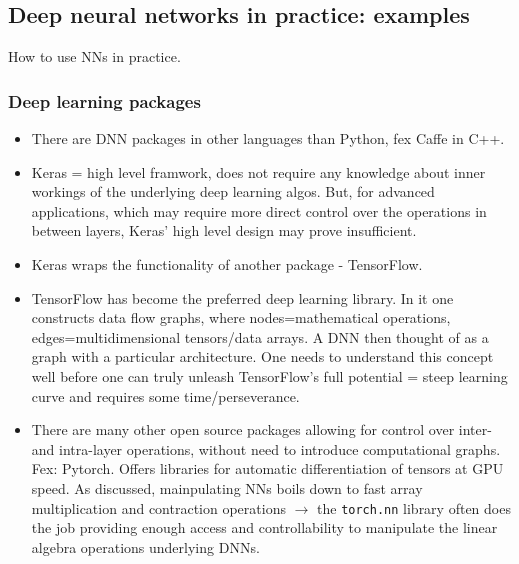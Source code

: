 \documentclass[norsk,a4paper,11pt]{article}
\begin{document}
\subsection{Deep neural networks in practice: examples}
How to use NNs in practice.

\subsubsection{Deep learning packages}
\begin{itemize}
	\item There are DNN packages in other languages than Python, fex Caffe in C++.
	\item Keras = high level framwork, does not require any knowledge about inner workings of the underlying deep learning algos. But, for advanced applications, which may require more direct control over the operations in between layers, Keras' high level design may prove insufficient.
	\item Keras wraps the functionality of another package - TensorFlow.
	\item TensorFlow has become the preferred deep learning library. In it one constructs data flow graphs, where nodes=mathematical operations, edges=multidimensional tensors/data arrays. A DNN then thought of as a graph with a particular architecture. One needs to understand this concept well before one can truly unleash TensorFlow's full potential = steep learning curve and requires some time/perseverance.
	\item There are many other open source packages allowing for control over inter- and intra-layer operations, without need to introduce computational graphs. Fex: Pytorch. Offers libraries for automatic differentiation of tensors at GPU speed. As discussed, mainpulating NNs boils down to fast array multiplication and contraction operations $\rightarrow$ the \texttt{torch.nn} library often does the job providing enough access and controllability to manipulate the linear algebra operations underlying DNNs.
\end{itemize}
\end{document}
